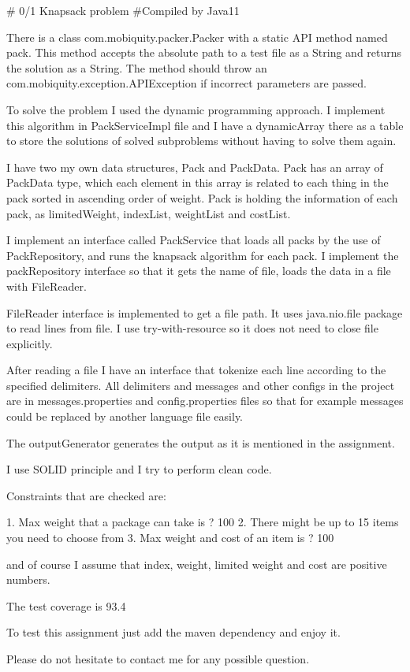# 0/1 Knapsack problem
#Compiled by Java11

There is a class com.mobiquity.packer.Packer with a static API method named pack. This method accepts the absolute path to a test file as a String and returns the solution as a String. The method should throw an com.mobiquity.exception.APIException if incorrect parameters are passed.

To solve the problem I used the dynamic programming approach. I implement this algorithm in PackServiceImpl file and I have a dynamicArray there as a table to store the solutions of solved subproblems without having to solve them again.

I have two my own data structures, Pack and PackData. Pack has an array of PackData type, which each element in this array is related to each thing in the pack sorted in ascending order of weight. Pack is holding the information of each pack, as limitedWeight, indexList, weightList and costList. 

I implement an interface called PackService that loads all packs by the use of PackRepository, and runs the knapsack algorithm for each pack. I implement the packRepository interface so that it gets the name of file, loads the data in a file with FileReader. 

FileReader interface is implemented to get a file path. It uses java.nio.file package to read lines from file. I use try-with-resource so it does not need to close file explicitly.

After reading a file I have an interface that tokenize each line according to the specified delimiters. All delimiters and messages and other configs in the project are in messages.properties and config.properties files so that for example messages could be replaced by another language file easily.

The outputGenerator generates the output as it is mentioned in the assignment.

I use SOLID principle and I try to perform clean code.

Constraints that are checked are:

1. Max weight that a package can take is ? 100
2. There might be up to 15 items you need to choose from
3. Max weight and cost of an item is ? 100

and of course I assume that index, weight, limited weight and cost are positive numbers.

The test coverage is 93.4

To test this assignment just add the maven dependency and enjoy it.

Please do not hesitate to contact me for any possible question. 